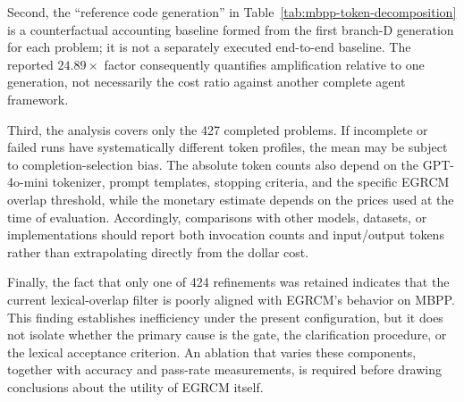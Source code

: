 Second, the ``reference code generation'' in
Table~\ref{tab:mbpp-token-decomposition} is a counterfactual accounting
baseline formed from the first branch-D generation for each problem; it is
not a separately executed end-to-end baseline. The reported \(24.89\times\)
factor consequently quantifies amplification relative to one generation, not
necessarily the cost ratio against another complete agent framework.

Third, the analysis covers only the 427 completed problems. If incomplete or
failed runs have systematically different token profiles, the mean may be
subject to completion-selection bias. The absolute token counts also depend on
the GPT-4o-mini tokenizer, prompt templates, stopping criteria, and the
specific EGRCM overlap threshold, while the monetary estimate depends on the
prices used at the time of evaluation. Accordingly, comparisons with other
models, datasets, or implementations should report both invocation counts and
input/output tokens rather than extrapolating directly from the dollar cost.

Finally, the fact that only one of 424 refinements was retained indicates that
the current lexical-overlap filter is poorly aligned with EGRCM's behavior on
MBPP. This finding establishes inefficiency under the present configuration,
but it does not isolate whether the primary cause is the gate, the
clarification procedure, or the lexical acceptance criterion. An ablation
that varies these components, together with accuracy and pass-rate
measurements, is required before drawing conclusions about the utility of
EGRCM itself.
